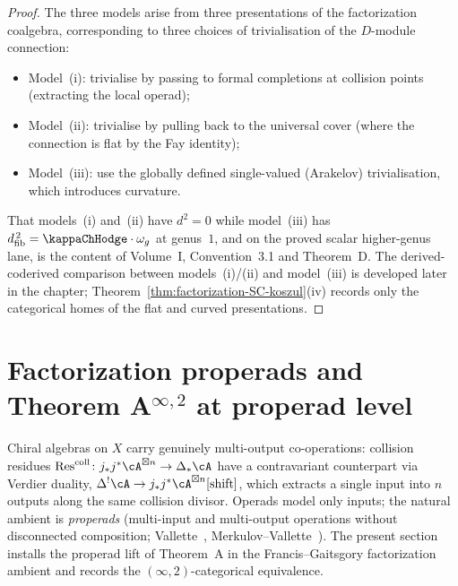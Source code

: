 \begin{proof}
The three models arise from three presentations of the factorization
coalgebra, corresponding to three choices of trivialisation of the
$D$-module connection:
\begin{itemize}
\item Model~(i): trivialise by passing to formal completions at
 collision points (extracting the local operad);
\item Model~(ii): trivialise by pulling back to the universal cover
 (where the connection is flat by the Fay identity);
\item Model~(iii): use the globally defined single-valued
 (Arakelov) trivialisation, which introduces curvature.
\end{itemize}
That models~(i) and~(ii) have $d^2 = 0$ while model~(iii)
has $\dfib^{\,2} = \kappaChHodge \cdot \omega_g$ at genus~$1$, and on the
proved scalar higher-genus lane, is the content of
Volume~I, Convention~3.1 and Theorem~D. The derived-coderived
comparison between models~(i)/(ii) and model~(iii) is developed
later in the chapter; Theorem~\ref{thm:factorization-SC-koszul}(iv)
records only the categorical homes of the flat and curved
presentations.
\end{proof}


\section{Factorization properads and Theorem A${}^{\infty,2}$ at properad level}
\label{sec:factorization-properad}

Chiral algebras on $X$ carry genuinely multi-output co-operations:
collision residues
$\mathrm{Res}^{\mathrm{coll}}\colon j_*j^*\cA^{\boxtimes n}\to \Delta_*\cA$
have a contravariant counterpart via Verdier duality,
$\Delta^!\cA\to j_*j^*\cA^{\boxtimes n}[\text{shift}]$,
which extracts a single input into $n$ outputs along the same
collision divisor. Operads model only inputs; the natural ambient
is \emph{properads} (multi-input and multi-output operations
without disconnected composition; Vallette~\cite{Val07},
Merkulov--Vallette~\cite{MV09}). The present section installs the
properad lift of Theorem~A in the Francis--Gaitsgory factorization
ambient and records the $(\infty,2)$-categorical equivalence.

